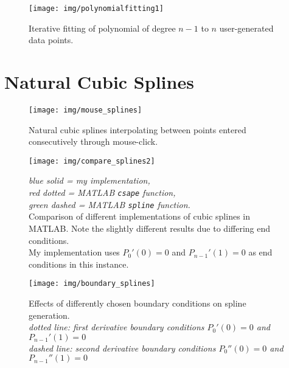 \documentclass{scrartcl}
\begin{document}
\begin{figure}[H]
	\texttt{[image: img/polynomialfitting1]}
	\caption{
		Iterative fitting of polynomial of degree $n-1$ to $n$ user-generated data points.
	}
	\label{fig:regression3}
\end{figure}

\section{Natural Cubic Splines}
\begin{figure}[H]
	\texttt{[image: img/mouse\_splines]}
	\caption{
		Natural cubic splines interpolating between points entered consecutively through mouse-click.
	}
	\label{fig:splines1}
\end{figure}
\begin{figure}[H]
	\texttt{[image: img/compare\_splines2]}
	\caption{
		{\footnotesize 
			\textit{blue solid = my implementation, \\
				red dotted = \emph{MATLAB \texttt{csape}} function,\\
				green dashed = \emph{MATLAB \texttt{spline}} function.}
		}\\
		Comparison of different implementations of cubic splines in MATLAB. Note the slightly different results due to differing end conditions.\\My implementation uses $P_0'(0)=0$ and $P_{n-1}'(1)=0$ as end conditions in this instance.
	}
	\label{fig:splines2}
\end{figure}
\begin{figure}[H]
	\texttt{[image: img/boundary\_splines]}
	\caption{
		Effects of differently chosen boundary conditions on spline generation.\\
		{\footnotesize 
			\textit{dotted line: first derivative boundary conditions $P_0'(0)=0$ and $P_{n-1}'(1)=0$\\
				dashed line: second derivative boundary conditions $P_0''(0)=0$ and $P_{n-1}''(1)=0$}
		}
	}
	\label{fig:splines3}
\end{figure}
\end{document}

